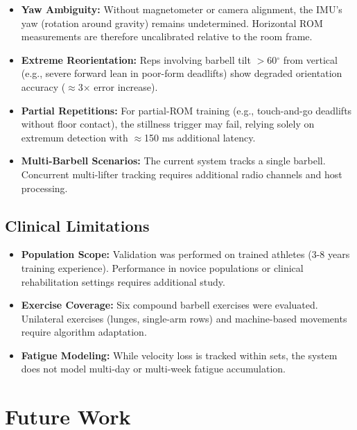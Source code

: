 \begin{itemize}
    \item \textbf{Yaw Ambiguity:} Without magnetometer or camera alignment, the IMU's yaw (rotation around gravity) remains undetermined. Horizontal ROM measurements are therefore uncalibrated relative to the room frame.

    \item \textbf{Extreme Reorientation:} Reps involving barbell tilt $>$60$^\circ$ from vertical (e.g., severe forward lean in poor-form deadlifts) show degraded orientation accuracy ($\approx$3$\times$ error increase).

    \item \textbf{Partial Repetitions:} For partial-ROM training (e.g., touch-and-go deadlifts without floor contact), the stillness trigger may fail, relying solely on extremum detection with $\approx$150 ms additional latency.

    \item \textbf{Multi-Barbell Scenarios:} The current system tracks a single barbell. Concurrent multi-lifter tracking requires additional radio channels and host processing.
\end{itemize}

\subsection{Clinical Limitations}

\begin{itemize}
    \item \textbf{Population Scope:} Validation was performed on trained athletes (3-8 years training experience). Performance in novice populations or clinical rehabilitation settings requires additional study.

    \item \textbf{Exercise Coverage:} Six compound barbell exercises were evaluated. Unilateral exercises (lunges, single-arm rows) and machine-based movements require algorithm adaptation.

    \item \textbf{Fatigue Modeling:} While velocity loss is tracked within sets, the system does not model multi-day or multi-week fatigue accumulation.
\end{itemize}

\section{Future Work}


